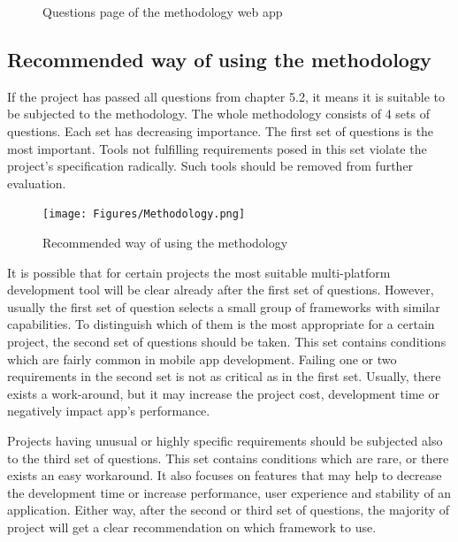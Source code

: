 \documentclass[english,master,public,dept460,male,cpdeclaration,oneside]{diploma}
\begin{document}
\begin{figure}
	\centering{}
	\caption{Questions page of the methodology web app}
\end{figure}

\subsection{Recommended way of using the methodology}
If the project has passed all questions from chapter 5.2, it means it is suitable to be subjected to the methodology. The whole methodology consists of 4 sets of questions. Each set has decreasing importance. The first set of questions is the most important. Tools not fulfilling requirements posed in this set violate the project's specification radically. Such tools should be removed from further evaluation.

\begin{figure}
	\centering\texttt{[image: Figures/Methodology.png]}
	\caption{Recommended way of using the methodology}
\end{figure}
	
It is possible that for certain projects the most suitable multi-platform development tool will be clear already after the first set of questions. However, usually the first set of question selects a small group of frameworks with similar capabilities. To distinguish which of them is the most appropriate for a certain project, the second set of questions should be taken. This set contains conditions which are fairly common in mobile app development. Failing one or two requirements in the second set is not as critical as in the first set. Usually, there exists a work-around, but it may increase the project cost, development time or negatively impact app's performance.
	
Projects having unusual or highly specific requirements should be subjected also to the third set of questions. This set contains conditions which are rare, or there exists an easy workaround. It also focuses on features that may help to decrease the development time or increase performance, user experience and stability of an application. Either way, after the second or third set of questions, the majority of project will get a clear recommendation on which framework to use.
	
\end{document}
